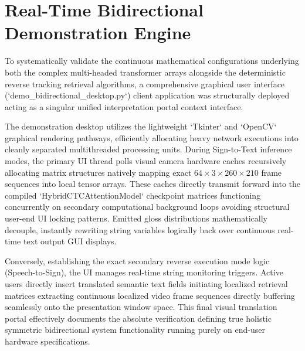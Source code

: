 \section{Real-Time Bidirectional Demonstration Engine}

To systematically validate the continuous mathematical configurations underlying both the complex multi-headed transformer arrays alongside the deterministic reverse tracking retrieval algorithms, a comprehensive graphical user interface (`demo\_bidirectional\_desktop.py`) client application was structurally deployed acting as a singular unified interpretation portal context interface.

The demonstration desktop utilizes the lightweight `Tkinter` and `OpenCV` graphical rendering pathways, efficiently allocating heavy network executions into cleanly separated multithreaded processing units. During Sign-to-Text inference modes, the primary UI thread polls visual camera hardware caches recursively allocating matrix structures natively mapping exact $64 \times 3 \times 260 \times 210$ frame sequences into local tensor arrays. These caches directly transmit forward into the compiled `HybridCTCAttentionModel` checkpoint matrices functioning concurrently on secondary computational background loops avoiding structural user-end UI locking patterns. Emitted gloss distributions mathematically decouple, instantly rewriting string variables logically back over continuous real-time text output GUI displays.

Conversely, establishing the exact secondary reverse execution mode logic (Speech-to-Sign), the UI manages real-time string monitoring triggers. Active users directly insert translated semantic text fields initiating localized retrieval matrices extracting continuous localized video frame sequences directly buffering seamlessly onto the presentation window space. This final visual translation portal effectively documents the absolute verification defining true holistic symmetric bidirectional system functionality running purely on end-user hardware specifications.
